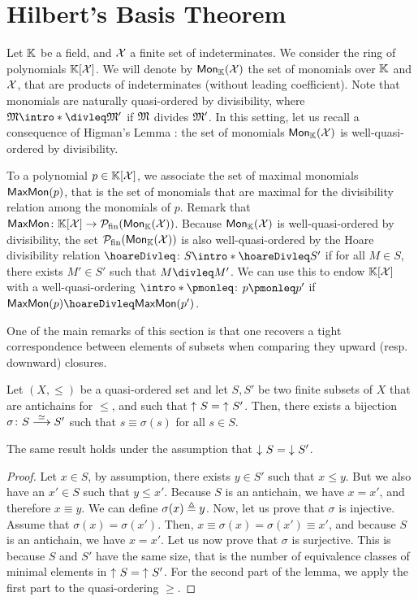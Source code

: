 \section{Hilbert's Basis Theorem}
\label{sec:hilbert}

Let $\mathbb{K}$ be a field, and $\mathcal{X}$ a finite set of indeterminates. We
consider the ring of polynomials $\Poly{\Indets}$. We will denote by
$\Mon{\Indets}$ the set of monomials over $\mathbb{K}$ and $\mathcal{X}$, that are
products of indeterminates (without leading coefficient). Note that monomials
are naturally quasi-ordered by divisibility, where $\mon \intro*\divleq \mon'$ if
$\mon$ divides $\mon'$. In this setting, let us recall a consequence of
Higman's Lemma \cite{HIG52}: the set of monomials $\Mon{\Indets}$ is
well-quasi-ordered by divisibility.

To a polynomial $p \in \Poly{\Indets}$, we associate the set of maximal
monomials $\mathsf{MaxMon}(p)$, that is the set of monomials that are maximal for the
divisibility relation among the monomials of $p$. Remark that $\MaxMon \colon
\Poly{\Indets} \to \Pfin(\Mon{\Indets})$. Because $\Mon{\Indets}$ is
well-quasi-ordered by divisibility, the set $\Pfin(\Mon{\Indets})$ is also
well-quasi-ordered by the Hoare divisibility relation $\hoareDivleq$: $S \intro*\hoareDivleq
S'$ if for all $M \in S$, there exists $M' \in S'$ such that $M \divleq M'$.
We can use this to endow $\Poly{\Indets}$ with a well-quasi-ordering $\intro*\pmonleq$:
$p \pmonleq p'$ if $\MaxMon(p) \hoareDivleq \MaxMon(p')$.

One of the main remarks of this section is that one recovers a tight
correspondence between elements of subsets when comparing they upward (resp.
downward) closures.

\begin{lemma}
    \label{lem:antichain-bijection}
    Let $(X,\leq)$ be a quasi-ordered set
    and let $S, S'$ be two finite subsets of $X$
    that are antichains for $\leq$,
    and such that $\upset{S} = \upset{S'}$.
    Then, there exists a bijection $\sigma \colon S \stackrel{\simeq}{\longrightarrow} S'$
    such that $s \equiv \sigma(s)$ for all $s \in S$.

    The same result holds under the assumption that
    $\dwset{S} = \dwset{S'}$.
\end{lemma}
\begin{proof}
    Let $x \in S$, by assumption,
    there exists $y \in S'$
    such that $x \leq y$. But we also have
    an $x' \in S$ such that $y \leq x'$.
    Because $S$ is an antichain, we have $x = x'$,
    and therefore $x \equiv y$.
    We can define $\sigma(x) \triangleq y$.
    Now, let us prove that $\sigma$ is injective.
    Assume that $\sigma(x) = \sigma(x')$.
    Then, $x \equiv \sigma(x) = \sigma(x') \equiv x'$,
    and because $S$ is an antichain, we have $x = x'$.
    Let us now prove that $\sigma$ is surjective.
    This is because $S$ and $S'$ have the same size, that is
    the number of equivalence classes of minimal elements
    in $\upset{S} = \upset{S'}$.
    For the second part of the lemma, we apply
    the first part to the quasi-ordering $\geq$.
\end{proof}


